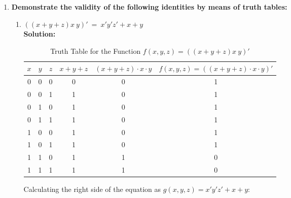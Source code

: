 \documentclass[table]{article}
\begin{document}
\begin{enumerate}[label=\textbf{\arabic*.}]
    \item \textbf{Demonstrate the validity of the following identities by means of truth tables:} \\
    
    \begin{enumerate}[label=\textbf{\alph*.}]
        \item \(\left(\left(x  + y +z\right)x \ y\right)' \ = \ x' y' z' + x + y\) \\

        \textbf{Solution:} \\

        \begin{table}[h]
            \centering
            \captionsetup{belowskip=10pt} %
            \caption{Truth Table for the Function \( f(x,y,z) = \left( \left(x  + y +z\right)x \ y\right)'\)} 
            
            \label{tab:my-table}
            \begin{tabular}{|c|c|c|c|c|c|}
                \hline
                \( x \) & \( y \) & \( z \) & \( x + y + z \) & \( (x + y + z) \cdot x \cdot y \) & \( f(x, y, z) = \left( (x + y + z) \cdot x \cdot y \right)' \) \\
                \hline
                0 & 0 & 0 & 0 & 0 & 1 \\
                0 & 0 & 1 & 1 & 0 & 1 \\
                0 & 1 & 0 & 1 & 0 & 1 \\
                0 & 1 & 1 & 1 & 0 & 1 \\
                1 & 0 & 0 & 1 & 0 & 1 \\
                1 & 0 & 1 & 1 & 0 & 1 \\
                1 & 1 & 0 & 1 & 1 & 0 \\
                1 & 1 & 1 & 1 & 1 & 0 \\
                \bottomrule
            \end{tabular}
        \end{table}
        


        Calculating the right side of the equation as \(g(x,y,z) =  x' y' z' + x + y\): \\



\end{enumerate}
\end{enumerate}
\end{document}
